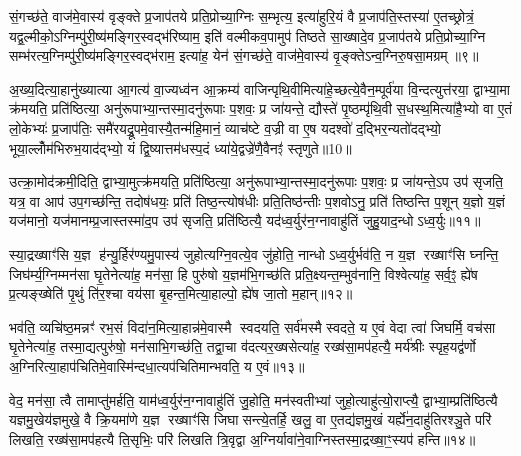 सं॒गच्छ॑ते॒ वाज॑मे॒वास्य॑ वृङ्क्ते प्र॒जाप॑तये प्रति॒प्रोच्या॒ग्निः स॒म्भृत्य॒ इत्या॑हुरि॒यं वै प्र॒जाप॑ति॒स्तस्या॑ ए॒तच्छ्रोत्रं॒ यद्व॒ल्मीको॒ऽग्निम्पु॑री॒ष्य॑मङ्गिर॒स्वद्भ॑रिष्याम॒ इति॑ वल्मीकव॒पामुप॑ तिष्ठते सा॒ख्षादे॒व प्र॒जाप॑तये प्रति॒प्रोच्या॒ग्नि सम्भ॑रत्य॒ग्निम्पु॑री॒ष्य॑मङ्गिर॒स्वद्भ॑राम॒ इत्या॑ह॒ येन॑ सं॒गच्छ॑ते॒ वाज॑मे॒वास्य॑ वृ॒ङ्क्तेऽन्व॒ग्निरु॒षसा॒मग्रम्॥९॥

अ॒ख्य॒दित्या॒हानु॑ख्यात्या आ॒गत्य॑ वा॒ज्यध्व॑न आ॒क्रम्य॑ वाजिन्पृथि॒वीमित्या॑हे॒च्छत्ये॒वैन॒म्पूर्व॑या वि॒न्दत्युत्त॑रया॒ द्वाभ्या॒मा क्र॑मयति॒ प्रति॑ष्ठित्या॒ अनु॑रूपाभ्या॒न्तस्मा॒दनु॑रूपाः प॒शवः॒ प्र जा॑यन्ते॒ द्यौस्ते॑ पृ॒ष्ठम्पृ॑थि॒वी स॒धस्थ॒मित्या॑है॒भ्यो वा ए॒तं लो॒केभ्यः॑ प्र॒जाप॑तिः॒ समै॑रयद्रू॒पमे॒वास्यै॒तन्म॑हि॒मानं॒ व्याच॑ष्टे व॒ज्री वा ए॒ष यदश्वो॑ द॒द्भिर॒न्यतो॑दद्भ्यो॒ भूया॒ल्लोँम॑भिरुभ॒याद॑द्भ्यो॒ यं द्वि॒ष्यात्तम॑धस्प॒दं ध्या॑ये॒द्वज्रे॑णै॒वैनꣵ॑ स्तृणुते॥10॥

{\anuvakamend[{आ॒ह॒ पापी॑यान्रु॒द्रादे॒व येनाग्रं॑ व॒ज्री वै स॒प्तद॑श च॥२॥}]}

उत्क्रा॒मोद॑क्रमी॒दिति॒ द्वाभ्या॒मुत्क्र॑मयति॒ प्रति॑ष्ठित्या॒ अनु॑रूपाभ्या॒न्तस्मा॒दनु॑रूपाः प॒शवः॒ प्र जा॑यन्ते॒ऽप उप॑ सृजति॒ यत्र॒ वा आप॑ उप॒गच्छ॑न्ति॒ तदोष॑धयः॒ प्रति॑ तिष्ठ॒न्त्योष॑धीः प्रति॒तिष्ठ॑न्तीः प॒शवोऽनु॒ प्रति॑ तिष्ठन्ति प॒शून् य॒ज्ञो य॒ज्ञं यज॑मानो॒ यज॑मानम्प्र॒जास्तस्मा॑द॒प उप॑ सृजति॒ प्रति॑ष्ठित्यै॒ यद॑ध्व॒र्युर॑न॒ग्नावाहु॑तिं जुहु॒याद॒न्धोऽध्व॒र्युः॥११॥

स्या॒द्रख्षाꣳ॑सि य॒ज्ञ ह॑न्यु॒र्\mbox{}हिर॑ण्यमु॒पास्य॑ जुहोत्यग्नि॒वत्ये॒व जु॑होति॒ नान्धोऽध्व॒र्युर्भव॑ति॒ न य॒ज्ञ रख्षाꣳ॑सि घ्नन्ति॒ जिघ॑र्म्य॒ग्निम्मन॑सा घृ॒तेनेत्या॑ह॒ मन॑सा॒ हि पुरु॑षो य॒ज्ञम॑भि॒गच्छ॑ति प्रति॒क्ष्यन्त॒म्भुव॑नानि॒ विश्वेत्या॑ह॒ सर्व॒ꣵ॒ ह्ये॑ष प्र॒त्यङ्ख्षेति॑ पृ॒थुं ति॑र॒श्चा वय॑सा बृ॒हन्त॒मित्या॒हाल्पो॒ ह्ये॑ष जा॒तो म॒हान्॥१२॥

भव॑ति॒ व्यचि॑ष्ठ॒मन्नꣳ॑ रभ॒सं विदा॑न॒मित्या॒हान्न॑मे॒वास्मै स्वदयति॒ सर्व॑मस्मै स्वदते॒ य ए॒वं वेदा त्वा॑ जिघर्मि॒ वच॑सा घृ॒तेनेत्या॑ह॒ तस्मा॒द्यत्पुरु॑षो॒ मन॑साभि॒गच्छ॑ति॒ तद्वा॒चा व॑दत्यर॒ख्षसेत्या॑ह॒ रख्ष॑सा॒मप॑हत्यै॒ मर्य॑श्रीः स्पृह॒यद्व॑र्णो अ॒ग्निरित्या॒हाप॑चितिमे॒वास्मि॑न्दधा॒त्यप॑चितिमान्भवति॒ य ए॒वं॥१३॥

वेद॒ मन॑सा॒ त्वै तामाप्तु॑मर्\mbox{}हति॒ याम॑ध्व॒र्युर॑न॒ग्नावाहु॑तिं जु॒होति॒ मन॑स्वतीभ्यां जुहो॒त्याहु॑त्यो॒राप्त्यै॒ द्वाभ्या॒म्प्रति॑ष्ठित्यै यज्ञमु॒खेय॑ज्ञमुखे॒ वै क्रि॒यमा॑णे य॒ज्ञ रख्षाꣳ॑सि जिघासन्त्ये॒तर्\mbox{}हि॒ खलु॒ वा ए॒तद्य॑ज्ञमु॒खं यर्\mbox{}ह्ये॑न॒दाहु॑तिरश्ञु॒ते परि॑ लिखति॒ रख्ष॑सा॒मप॑हत्यै ति॒सृभिः॒ परि॑ लिखति त्रि॒वृद्वा अ॒ग्निर्यावा॑ने॒वाग्निस्तस्मा॒द्रख्षा॒ꣳ॒स्यप॑ हन्ति॥१४॥

